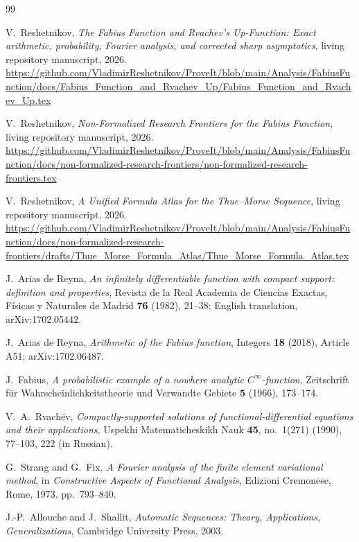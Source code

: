 \documentclass[11pt,oneside]{article}
\numberwithin{equation}{section}
\theoremstyle{definition}
\theoremstyle{remark}
\begin{document}
\begin{thebibliography}{99}

V.~Reshetnikov,
\emph{The Fabius Function and Rvachev's Up-Function: Exact arithmetic, probability, Fourier analysis, and corrected sharp asymptotics},
living repository manuscript, 2026.
\url{https://github.com/VladimirReshetnikov/ProveIt/blob/main/Analysis/FabiusFunction/docs/Fabius_Function_and_Rvachev_Up/Fabius_Function_and_Rvachev_Up.tex}

V.~Reshetnikov,
\emph{Non-Formalized Research Frontiers for the Fabius Function},
living repository manuscript, 2026.
\url{https://github.com/VladimirReshetnikov/ProveIt/blob/main/Analysis/FabiusFunction/docs/non-formalized-research-frontiers/non-formalized-research-frontiers.tex}

V.~Reshetnikov,
\emph{A Unified Formula Atlas for the Thue--Morse Sequence},
living repository manuscript, 2026.
\url{https://github.com/VladimirReshetnikov/ProveIt/blob/main/Analysis/FabiusFunction/docs/non-formalized-research-frontiers/drafts/Thue_Morse_Formula_Atlas/Thue_Morse_Formula_Atlas.tex}

J.~Arias de Reyna,
\emph{An infinitely differentiable function with compact support: definition and properties},
Revista de la Real Academia de Ciencias Exactas, F\'isicas y Naturales de Madrid
\textbf{76} (1982), 21--38; English translation, arXiv:1702.05442.

J.~Arias de Reyna,
\emph{Arithmetic of the Fabius function},
Integers \textbf{18} (2018), Article A51; arXiv:1702.06487.

J.~Fabius,
\emph{A probabilistic example of a nowhere analytic $C^\infty$-function},
Zeitschrift f\"ur Wahrscheinlichkeitstheorie und Verwandte Gebiete
\textbf{5} (1966), 173--174.

V.~A.~Rvach\"ev,
\emph{Compactly-supported solutions of functional-differential equations and their applications},
Uspekhi Matematicheskikh Nauk \textbf{45}, no.~1(271) (1990), 77--103, 222 (in Russian).

G.~Strang and G.~Fix,
\emph{A Fourier analysis of the finite element variational method},
in \emph{Constructive Aspects of Functional Analysis}, Edizioni Cremonese, Rome, 1973, pp.~793--840.

J.-P.~Allouche and J.~Shallit,
\emph{Automatic Sequences: Theory, Applications, Generalizations},
Cambridge University Press, 2003.


\end{thebibliography}
\end{document}
